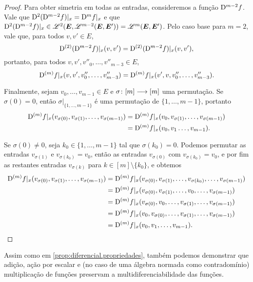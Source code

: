 \begin{proof}
Para obter simetria em todas as entradas, consideremos a função $\mathrm{D}^{m-2} f$. Vale que $\mathrm{D}^2(\mathrm{D}^{m-2} f)|_x = \mathrm{D}^m f|_x$ e que $\mathrm{D}^2(\mathrm{D}^{m-2} f)|_x \in \mathscr{L}^2(\bm E, \mathscr{L}^{m-2}(\bm E, \bm E')) = \mathscr{L}^m(\bm E, \bm E')$. Pelo caso base para $m=2$, vale que, para todos $v,v' \in E$,
	\begin{equation*}
	\mathrm{D}^{(2)}(\mathrm{D}^{m-2} f)|_x (v, v') = \mathrm{D}^{(2)}(\mathrm{D}^{m-2} f)|_x (v, v'),
	\end{equation*}
portanto, para todos $v, v', v''_0, \ldots, v''_{m-3} \in E$,
	\begin{equation*}
	\mathrm{D}^{(m)} f|_x (v, v', v''_0, \ldots, v''_{m-3}) = \mathrm{D}^{(m)} f|_x (v', v, v''_0, \ldots, v''_{m-3}).
	\end{equation*}

Finalmente, sejam $v_0, \ldots, v_{m-1} \in E$ e ${\sigma}\colon {[m]} \longrightarrow {[m]}$ uma permutação. Se $\sigma(0) = 0$, então $\sigma|_{\{1,\ldots,m-1\}}$ é uma permutação de $\{1,\ldots,m-1\}$, portanto
	\begin{align*}
	\mathrm{D}^{(m)} f|_x (v_{\sigma(0)}, v_{\sigma(1)}, \ldots, v_{\sigma(m-1)}) &= \mathrm{D}^{(m)} f|_x (v_0, v_{\sigma(1)}, \ldots, v_{\sigma(m-1)}) \\
		&= \mathrm{D}^{(m)} f|_x (v_0, v_1 \ldots, v_{m-1}).
	\end{align*}

Se $\sigma(0) \neq 0$, seja $k_0 \in \{1, \ldots, m-1\}$ tal que $\sigma(k_0) = 0$. Podemos permutar as entradas $v_{\sigma(1)}$ e $v_{\sigma(k_0)} = v_0$, então as entradas $v_{\sigma(0)}$ com $v_{\sigma(k_0)} = v_0$, e por fim as restantes entradas $v_{\sigma(k)}$ para $k \in [m] \setminus \{k_0\}$, e obtemos
	\begin{align*}
	\mathrm{D}^{(m)} f|_x (v_{\sigma(0)}, v_{\sigma(1)}, \ldots, v_{\sigma(m-1)}) &= \mathrm{D}^{(m)} f|_x (v_{\sigma(0)}, v_{\sigma(1)}, \ldots, v_{\sigma(k_0)}, \ldots, v_{\sigma(m-1)}) \\
		&= \mathrm{D}^{(m)} f|_x (v_{\sigma(0)}, v_{\sigma(1)}, \ldots, v_0, \ldots, v_{\sigma(m-1)}) \\
		&= \mathrm{D}^{(m)} f|_x (v_{\sigma(0)}, v_0, \ldots, v_{\sigma(1)}, \ldots, v_{\sigma(m-1)}) \\
		&= \mathrm{D}^{(m)} f|_x (v_0, v_{\sigma(0)}, \ldots, v_{\sigma(1)}, \ldots, v_{\sigma(m-1)}) \\
		&= \mathrm{D}^{(m)} f|_x (v_0, v_1, \ldots, v_{m-1}).
		\qedhere
	\end{align*}
\end{proof}

Assim como em \ref{prop:diferencial.propriedades}, também podemos demonstrar que adição, ação por escalar e (no caso de uma álgebra normada como contradomínio) multiplicação de funções preservam a multidiferenciabilidade das funções.

